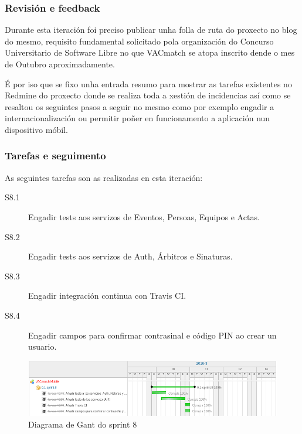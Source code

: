       \subsubsection{Revisión e feedback}
      Durante esta iteración foi preciso publicar unha folla de ruta do 
proxecto no blog do mesmo, requisito fundamental solicitado pola organización 
do Concurso Universitario de Software Libre no que VACmatch se atopa inscrito 
dende o mes de Outubro aproximadamente.

      É por iso que se fixo unha entrada resumo para mostrar as tarefas 
existentes no Redmine do proxecto donde se realiza toda a xestión de 
incidencias así como se resaltou os seguintes pasos a seguir no mesmo como por 
exemplo engadir a internacionalización ou permitir poñer en funcionamento a 
aplicación nun dispositivo móbil.

      \subsubsection{Tarefas e seguimento}

      As seguintes tarefas son as realizadas en esta iteración:

        \begin{description}
         \item [S8.1] Engadir tests aos servizos de Eventos, Persoas, Equipos e 
Actas.
         \item [S8.2] Engadir tests aos servizos de Auth, Árbitros e Sinaturas.
         \item [S8.3] Engadir integración continua con Travis CI.
         \item [S8.4] Engadir campos para confirmar contrasinal e código PIN ao 
crear un usuario.
        \end{description}

        \begin{figure}[h!]
          \begin{center}
          \includegraphics[width=\textwidth]{./img/gant_diagrams/08.png}
          \caption{Diagrama de Gant do sprint 8}
          \label{fig:gant08}
          \end{center}
        \end{figure}

